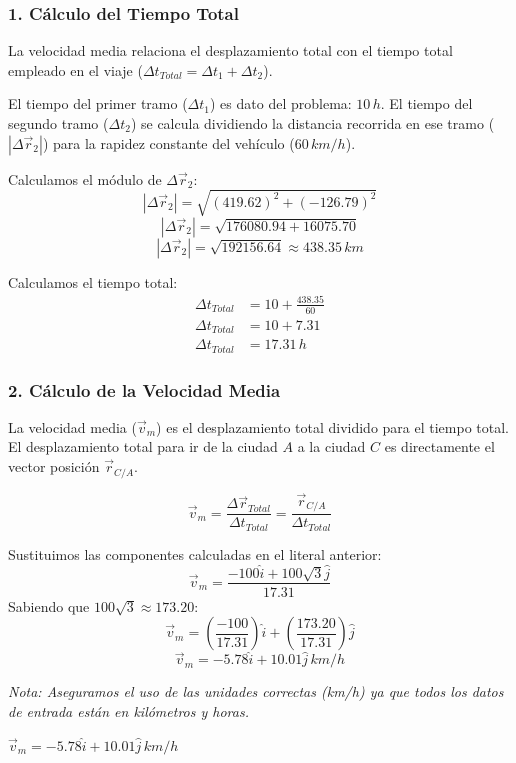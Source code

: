 \documentclass[12pt, a4paper]{article}
\begin{document}
\subsubsection*{1. Cálculo del Tiempo Total}
La velocidad media relaciona el desplazamiento total con el tiempo total empleado en el viaje ($\Delta t_{Total} = \Delta t_1 + \Delta t_2$).

El tiempo del primer tramo ($\Delta t_1$) es dato del problema: $10 \, \si{h}$.
El tiempo del segundo tramo ($\Delta t_2$) se calcula dividiendo la distancia recorrida en ese tramo ($|\Delta\vec{r}_2|$) para la rapidez constante del vehículo ($60 \, \si{km/h}$).

Calculamos el módulo de $\Delta\vec{r}_2$:
$$ |\Delta\vec{r}_2| = \sqrt{(419.62)^2 + (-126.79)^2} $$
$$ |\Delta\vec{r}_2| = \sqrt{176080.94 + 16075.70} $$
$$ |\Delta\vec{r}_2| = \sqrt{192156.64} \approx 438.35 \, \si{km} $$

Calculamos el tiempo total:
\begin{align*}
    \Delta t_{Total} &= 10 + \frac{438.35}{60} \\
    \Delta t_{Total} &= 10 + 7.31 \\
    \Delta t_{Total} &= 17.31 \, \si{h}
\end{align*}

\subsubsection*{2. Cálculo de la Velocidad Media}
La velocidad media ($\vec{v}_m$) es el desplazamiento total dividido para el tiempo total. El desplazamiento total para ir de la ciudad $A$ a la ciudad $C$ es directamente el vector posición $\vec{r}_{C/A}$.

$$ \vec{v}_m = \frac{\Delta\vec{r}_{Total}}{\Delta t_{Total}} = \frac{\vec{r}_{C/A}}{\Delta t_{Total}} $$

Sustituimos las componentes calculadas en el literal anterior:
$$ \vec{v}_m = \frac{-100\hat{i} + 100\sqrt{3}\hat{j}}{17.31} $$
Sabiendo que $100\sqrt{3} \approx 173.20$:
$$ \vec{v}_m = \left( \frac{-100}{17.31} \right)\hat{i} + \left( \frac{173.20}{17.31} \right)\hat{j} $$
$$ \vec{v}_m = -5.78\hat{i} + 10.01\hat{j} \, \si{km/h} $$

\textit{Nota: Aseguramos el uso de las unidades correctas (\si{km/h}) ya que todos los datos de entrada están en kilómetros y horas.}

\begin{tcolorbox}[colback=green!5!white, colframe=green!50!black, title=Respuesta Final]
\centering \Large $\vec{v}_m = -5.78\hat{i} + 10.01\hat{j} \, \si{km/h}$
\end{tcolorbox}
\end{document}
